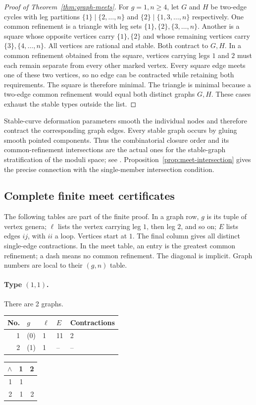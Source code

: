 \documentclass[11pt,a4paper]{article}
\theoremstyle{definition}
\begin{document}
\begin{proof}[Proof of Theorem~\ref{thm:graph-meets}]
For $g=1,n\geq4$, let $G$ and $H$ be two-edge cycles with leg
partitions $\{1\}\mid\{2,\ldots,n\}$ and
$\{2\}\mid\{1,3,\ldots,n\}$ respectively. One common refinement is
a triangle with leg sets $\{1\},\{2\},\{3,\ldots,n\}$.
Another is a square whose opposite vertices carry $\{1\},\{2\}$
and whose remaining vertices carry $\{3\},\{4,\ldots,n\}$.
All vertices are rational and stable. Both contract to $G,H$.
In a common refinement obtained from the square, vertices carrying
legs $1$ and $2$ must each remain separate from every other marked
vertex. Every square edge meets one of these two vertices, so no
edge can be contracted while retaining both requirements. The square
is therefore minimal. The triangle is minimal because a two-edge
common refinement would equal both distinct graphs $G,H$.
These cases exhaust the stable types outside the list.
\end{proof}

Stable-curve deformation parameters smooth the individual nodes and
therefore contract the corresponding graph edges. Every stable graph
occurs by gluing smooth pointed components. Thus the combinatorial
closure order and its common-refinement intersections are the actual
ones for the stable-graph stratification of the moduli space; see
\cite[Proposition~4.14; Sections~6.1 and~7.3]{Schmitt}.
Proposition~\ref{prop:meet-intersection} gives the precise connection
with the single-member intersection condition.

\subsection{Complete finite meet certificates}
The following tables are part of the finite proof. In a graph row,
$g$ is its tuple of vertex genera; $\ell$ lists the vertex carrying
leg $1$, then leg $2$, and so on; $E$ lists edges $ij$, with $ii$
a loop. Vertices start at $1$. The final column gives all distinct
single-edge contractions. In the meet table, an entry is the greatest
common refinement; a dash means no common refinement. The diagonal
is implicit. Graph numbers are local to their $(g,n)$ table.

\paragraph{Type $(1,1)$.} There are 2 graphs.
\begin{center}\small
\begin{tabular}{rllll}\toprule
No.&$g$&$\ell$&$E$&Contractions\\\midrule
1 & (0) & 1 & 11 & 2\\
2 & (1) & 1 & -- & --\\
\bottomrule\end{tabular}\end{center}
\begin{center}\scriptsize\setlength{\tabcolsep}{2pt}
\begin{tabular}{r|rr}
$\wedge$&1&2\\\hline
1&1&\\
2&1&2\\
\end{tabular}\end{center}
\end{document}

